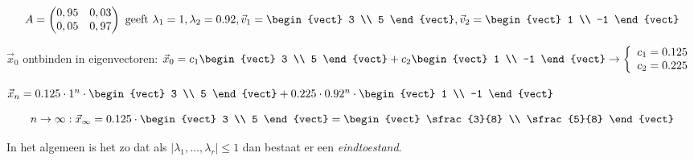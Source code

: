 \[ A = \begin{pmatrix*}[r] 0,95 & 0,03 \\ 0,05 & 0,97 \end{pmatrix*} \mbox{ geeft } \lambda_1 = 1, \lambda_2 = 0.92, \vec{v}_1 = \begin{vect} 3 \\ 5 \end{vect}, \vec{v}_2 = \begin{vect} 1 \\ -1 \end{vect} \]

$\vec{x}_0$ ontbinden in eigenvectoren: $\vec{x}_0 = c_1 \begin{vect} 3 \\ 5 \end{vect} + c_2 \begin{vect} 1 \\ -1 \end{vect} \to \left\{\begin{array}{c}
	c_1 = 0.125 \\
	c_2 = 0.225
\end{array}\right.$

$\vec{x}_n = 0.125 \cdot 1^n \cdot \begin{vect} 3 \\ 5 \end{vect} + 0.225 \cdot 0.92^n \cdot \begin{vect} 1 \\ -1 \end{vect}$

\[ n \to \infty: \vec{x}_\infty = 0.125 \cdot \begin{vect} 3 \\ 5 \end{vect} = \begin{vect} \sfrac{3}{8} \\ \sfrac{5}{8} \end{vect} \]

In het algemeen is het zo dat als $| \lambda_1, \ldots, \lambda_r| \leq 1$ dan bestaat er een \emph{eindtoestand}. 